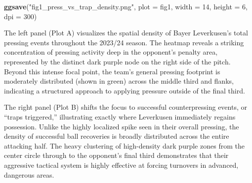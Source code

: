 \documentclass[
]{article}
\newenvironment{Shaded}{\begin{snugshade}}{\end{snugshade}}
\newcommand{\AttributeTok}[1]{\textcolor[rgb]{0.13,0.29,0.53}{#1}}
\newcommand{\DecValTok}[1]{\textcolor[rgb]{0.00,0.00,0.81}{#1}}
\newcommand{\FunctionTok}[1]{\textcolor[rgb]{0.13,0.29,0.53}{\textbf{#1}}}
\newcommand{\NormalTok}[1]{#1}
\newcommand{\StringTok}[1]{\textcolor[rgb]{0.31,0.60,0.02}{#1}}
\begin{document}
\begin{Shaded}
\begin{Highlighting}[]
\FunctionTok{ggsave}\NormalTok{(}\StringTok{"fig1\_press\_vs\_trap\_density.png"}\NormalTok{, }\AttributeTok{plot =}\NormalTok{ fig1,}
       \AttributeTok{width =} \DecValTok{14}\NormalTok{, }\AttributeTok{height =} \DecValTok{6}\NormalTok{, }\AttributeTok{dpi =} \DecValTok{300}\NormalTok{)}
\end{Highlighting}
\end{Shaded}

The left panel (Plot A) visualizes the spatial density of Bayer
Leverkusen's total pressing events throughout the 2023/24 season. The
heatmap reveals a striking concentration of pressing activity deep in
the opponent's penalty area, represented by the distinct dark purple
node on the right side of the pitch. Beyond this intense focal point,
the team's general pressing footprint is moderately distributed (shown
in green) across the middle third and flanks, indicating a structured
approach to applying pressure outside of the final third.

The right panel (Plot B) shifts the focus to successful counterpressing
events, or ``traps triggered,'' illustrating exactly where Leverkusen
immediately regains possession. Unlike the highly localized spike seen
in their overall pressing, the density of successful ball recoveries is
broadly distributed across the entire attacking half. The heavy
clustering of high-density dark purple zones from the center circle
through to the opponent's final third demonstrates that their aggressive
tactical system is highly effective at forcing turnovers in advanced,
dangerous areas.
\end{document}
